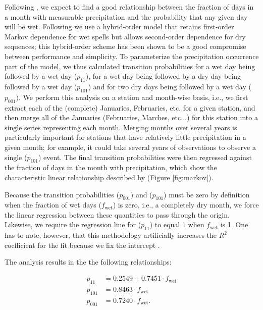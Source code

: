 \begin{refsection}
Following \cite{GengDevriesSupit1986}, we expect to find a good relationship between the fraction of days in a month with measurable precipitation and the probability that any given day will be wet. Following \cite{Wilks1999} we use a hybrid-order model that retains first-order Markov dependence for wet spells but allows second-order dependence for dry sequences; this hybrid-order scheme has been shown to be a good compromise between performance and simplicity. To parameterize the precipitation occurrence part of the model, we thus calculated transition probabilities for a wet day being followed by a wet day ($p_{11}$), for a wet day being followed by a dry day being followed by a wet day ($p_{101}$) and for two dry days being followed by a wet day ($p_{001})$. We perform this analysis on a station and month-wise basis, i.e., we first extract each of the (complete) Januaries, Februaries, etc. for a given station, and then merge all of the Januaries (Februaries, Marches, etc...) for this station into a single series representing each month. Merging months over several years is particularly important for stations that have relatively little precipitation in a given month; for example, it could take several years of observations to observe a single ($p_{101}$) event. The final transition probabilities were then regressed against the fraction of days in the month with precipitation, which show the characteristic linear relationship described by \cite{GengDevriesSupit1986} (Figure \ref{fig:markov}).

Because the transition probabilities ($p_{001})$ and ($p_{101}$) must be zero by definition when the fraction of wet days ($f_\mathrm{wet}$) is zero, i.e., a completely dry month, we force the linear regression between these quantities to pass through the origin. Likewise, we require the regression line for ($p_{11}$) to equal 1 when $f_\mathrm{wet}$ is 1. One has to note, however, that this methodology artificially increases the $R^2$ coefficient for the fit because we fix the intercept \citep[see for example][]{Gordon1981}. 

The analysis results in the the following relationships:

\begin{align}
p_{11} &= 0.2549 + 0.7451\cdot f_\mathrm{wet} \label{eq:p11}\\
p_{101} &= 0.8463 \cdot f_\mathrm{wet} \label{eq:p101}\\
p_{001} &= 0.7240 \cdot f_\mathrm{wet}. \label{eq:p001}
\end{align}


\end{refsection}
